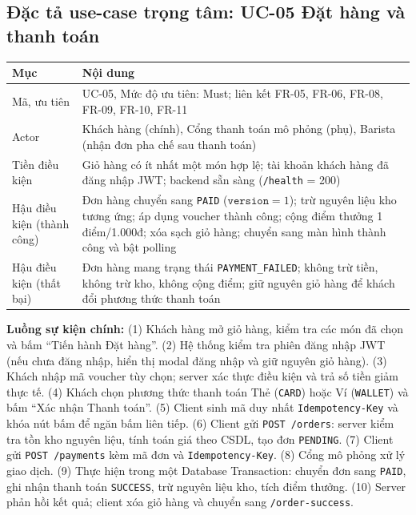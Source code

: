 \documentclass[12pt, a4paper]{article}
\begin{document}
\subsection{Đặc tả use-case trọng tâm: UC-05 Đặt hàng và thanh toán}
\begin{table}[!htbp]\centering\small
\begin{tabularx}{\textwidth}{@{}L{3.2cm} X@{}}
\toprule \textbf{Mục} & \textbf{Nội dung} \\ \midrule
Mã, ưu tiên & UC-05, Mức độ ưu tiên: Must; liên kết FR-05, FR-06, FR-08, FR-09, FR-10, FR-11 \\
Actor & Khách hàng (chính), Cổng thanh toán mô phỏng (phụ), Barista (nhận đơn pha chế sau thanh toán) \\
Tiền điều kiện & Giỏ hàng có ít nhất một món hợp lệ; tài khoản khách hàng đã đăng nhập JWT; backend sẵn sàng (\texttt{/health} = 200) \\
Hậu điều kiện (thành công) & Đơn hàng chuyển sang \texttt{PAID} ($\texttt{version}=1$); trừ nguyên liệu kho tương ứng; áp dụng voucher thành công; cộng điểm thưởng 1 điểm/1.000đ; xóa sạch giỏ hàng; chuyển sang màn hình thành công và bật polling \\
Hậu điều kiện (thất bại) & Đơn hàng mang trạng thái \texttt{PAYMENT\_FAILED}; không trừ tiền, không trừ kho, không cộng điểm; giữ nguyên giỏ hàng để khách đổi phương thức thanh toán \\ \bottomrule
\end{tabularx}
\end{table}

\textbf{Luồng sự kiện chính:}
(1) Khách hàng mở giỏ hàng, kiểm tra các món đã chọn và bấm ``Tiến hành Đặt hàng''.
(2) Hệ thống kiểm tra phiên đăng nhập JWT (nếu chưa đăng nhập, hiển thị modal đăng nhập và giữ nguyên giỏ hàng).
(3) Khách nhập mã voucher tùy chọn; server xác thực điều kiện và trả số tiền giảm thực tế.
(4) Khách chọn phương thức thanh toán Thẻ (\texttt{CARD}) hoặc Ví (\texttt{WALLET}) và bấm ``Xác nhận Thanh toán''.
(5) Client sinh mã duy nhất \texttt{Idempotency-Key} và khóa nút bấm để ngăn bấm liên tiếp.
(6) Client gửi \texttt{POST /orders}: server kiểm tra tồn kho nguyên liệu, tính toán giá theo CSDL, tạo đơn \texttt{PENDING}.
(7) Client gửi \texttt{POST /payments} kèm mã đơn và \texttt{Idempotency-Key}.
(8) Cổng mô phỏng xử lý giao dịch.
(9) Thực hiện trong một Database Transaction: chuyển đơn sang \texttt{PAID}, ghi nhận thanh toán \texttt{SUCCESS}, trừ nguyên liệu kho, tích điểm thưởng.
(10) Server phản hồi kết quả; client xóa giỏ hàng và chuyển sang \texttt{/order-success}.
\end{document}
